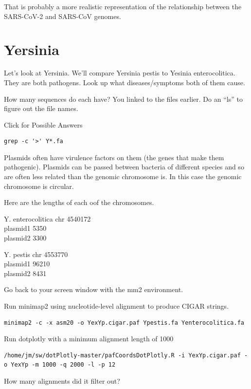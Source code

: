 \documentclass[
]{book}
\begin{document}
That is probably a more realistic representation of the relationship between the SARS-CoV-2 and SARS-CoV genomes.

\hypertarget{yersinia}{%
\section{Yersinia}\label{yersinia}}

Let's look at Yersinia. We'll compare Yersinia pestis to Yesinia enterocolitica. They are both pathogens. Look up what diseases/symptoms both of them cause.

How many sequences do each have? You linked to the files earlier. Do an ``ls'' to figure out the file names.

Click for Possible Answers

\begin{verbatim}
grep -c '>' Y*.fa
\end{verbatim}

\hfill\break

Plasmids often have virulence factors on them (the genes that make them pathogenic). Plasmids can be passed between bacteria of different species and so are often less related than the genomic chromosome is. In this case the genomic chromosome is circular.

Here are the lengths of each oof the chromosomes.

Y. enterocolitica
chr 4540172\\
plasmid1 5350\\
plasmid2 3300

Y. pestis
chr 4553770\\
plasmid1 96210\\
plasmid2 8431

Go back to your screen window with the mm2 environment.

Run minimap2 using nucleotide-level alignment to produce CIGAR strings.

\begin{verbatim}
minimap2 -c -x asm20 -o YexYp.cigar.paf Ypestis.fa Yenterocolitica.fa
\end{verbatim}

Run dotplotly with a minimum alignment length of 1000

\begin{verbatim}
/home/jm/sw/dotPlotly-master/pafCoordsDotPlotly.R -i YexYp.cigar.paf -o YexYp -m 1000 -q 2000 -l -p 12
\end{verbatim}

How many alignments did it filter out?
\end{document}
